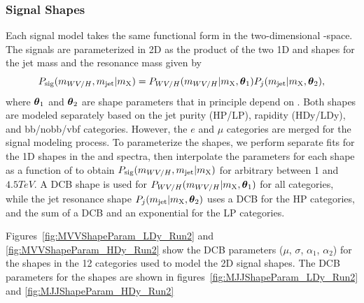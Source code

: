 \subsubsection{Signal Shapes}

Each signal model takes the same functional form in the two-dimensional \MJ-\MVV space.
The signals are parameterized in 2D as the product of the two 1D \MJ and \MVV shapes for the jet mass and the resonance mass given by
\begin{equation}
  P_\mathrm{sig}(m_{WV/H},m_\mathrm{jet}|m_\mathrm{X})=P_{WV/H}(m_{WV/H}|m_\mathrm{X},\vb*{\theta}_1)P_j(m_\mathrm{jet}|m_\mathrm{X},\vb*{\theta}_2),
\end{equation}
where $\vb*{\theta}_1$ and $\vb*{\theta}_2$ are shape parameters that in principle depend on \MX.
Both shapes are modeled separately based on the jet purity (HP/LP), rapidity (HDy/LDy), and bb/nobb/vbf categories.
However, the $e$ and $\mu$ categories are merged for the signal modeling process.
To parameterize the shapes, we perform separate fits for the 1D shapes in the \MVV and \MJ spectra, then interpolate the parameters for each shape as a function of \MX to obtain $P_\mathrm{sig}(m_{WV/H},m_\mathrm{jet}|m_\mathrm{X})$ for arbitrary \MX between 1 and $4.5\unit{TeV}$.
A DCB shape is used for $P_{WV/H}(m_{WV/H}|m_\mathrm{X},\vb*{\theta}_1)$ for all categories, while the jet resonance shape $P_j(m_\mathrm{jet}|m_\mathrm{X},\vb*{\theta}_2)$ uses a DCB for the HP categories, and the sum of a DCB and an exponential for the LP categories.

Figures~\ref{fig:MVVShapeParam_LDy_Run2} and \ref{fig:MVVShapeParam_HDy_Run2} show the DCB parameters ($\mu$, $\sigma$, $\alpha_1$, $\alpha_2$) for the \MVV shapes in the 12 categories used to model the 2D signal shapes.
The DCB parameters for the \MJ shapes are shown in figures~\ref{fig:MJJShapeParam_LDy_Run2} and \ref{fig:MJJShapeParam_HDy_Run2}

